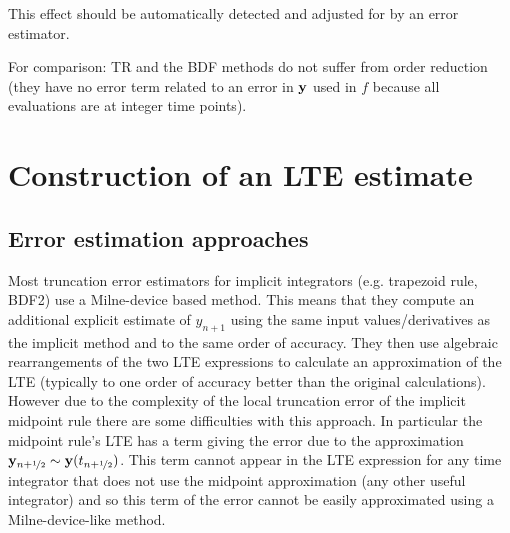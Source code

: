 This effect should be automatically detected and adjusted for by an error estimator.

For comparison: TR and the BDF methods do not suffer from order reduction\cite[pg. 159]{Atkinson1994} (\ie they have no error term related to an error in $\mathbf{y}$ used in $f$ because all evaluations are at integer time points).




\section{Construction of an LTE estimate}

\subsection{Error estimation approaches}
\label{sec:two-integrator-error}

Most truncation error estimators for implicit integrators (e.g. trapezoid rule, BDF2) use a Milne-device based method.\cite[pgs 707-716]{GreshoSani}
This means that they compute an additional explicit estimate of $y_{n+1}$ using the same input values/derivatives as the implicit method and to the same order of accuracy.
They then use algebraic rearrangements of the two LTE expressions to calculate an approximation of the LTE (typically to one order of accuracy better than the original calculations).
However due to the complexity of the local truncation error of the implicit midpoint rule there are some difficulties with this approach.
In particular the midpoint rule's LTE has a term giving the error due to the approximation $\mathbf{y}_{n+\nicefrac{1}{2}} \sim \mathbf{y}(t_{n+\nicefrac{1}{2}})$.
This term cannot appear in the LTE expression for any time integrator that does not use the midpoint approximation (\ie any other useful integrator) and so this term of the error cannot be easily approximated using a Milne-device-like method.

